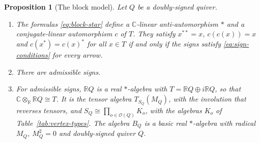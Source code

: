 \documentclass[12pt, a4paper]{report}
\theoremstyle{plain}
\newtheorem{proposition}[theorem]{Proposition}
\theoremstyle{definition}
\theoremstyle{remark}
\theoremstyle{plain}
\newcommand{\RR}{\mathbb{R}}
\newcommand{\CC}{\mathbb{C}}
\begin{document}
\begin{proposition}[The block model]\label{prop:block-model}
Let $Q$ be a doubly-signed quiver.
\begin{enumerate}
  \item The formulas \eqref{eq:block-star} define a $\CC$-linear anti-automorphism $*$ and a conjugate-linear automorphism $c$ of $T$. They satisfy $x^{**}=x$, $c(c(x))=x$ and $c(x^*)=c(x)^*$ for all $x\in T$ if and only if the signs satisfy \eqref{eq:sign-conditions} for every arrow.
  \item There are admissible signs.
  \item For admissible signs, $\RR Q$ is a real $*$-algebra with $T=\RR Q\oplus i\RR Q$, so that $\CC\otimes_\RR\RR Q\cong T$. It is the tensor algebra $T_{S_Q}(M_Q)$, with the involution that reverses tensors, and $S_Q\cong\prod_{o\in\mathcal O(Q)}K_o$, with the algebras $K_o$ of Table~\ref{tab:vertex-types}. The algebra $B_Q$ is a basic real $*$-algebra with radical $M_Q$, $M_Q^2=0$ and doubly-signed quiver $Q$.
\end{enumerate}
\end{proposition}
\end{document}
